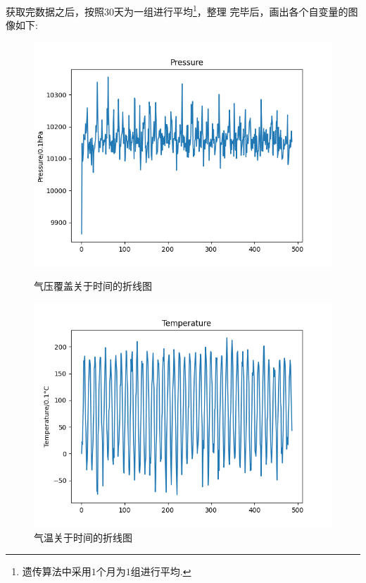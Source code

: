 \documentclass[UTF8, a4paper]{ctexart}
\begin{document}
获取完数据之后，按照$30$天为一组进行平均\footnote{遗传算法中采用$1$个月为$1$组进行平均.}，整理
完毕后，画出各个自变量的图像如下:
\begin{figure}[h!]
	\centering
	\begin{minipage}[h!]{0.4\textwidth}
		\centering
		\includegraphics[scale=0.3]{pp.png}
		\caption{气压覆盖关于时间的折线图}
	\end{minipage}
	\qquad
	\begin{minipage}[h!]{0.4\textwidth}
		\centering
		\includegraphics[scale=0.3]{tg.png}
		\caption{气温关于时间的折线图}
	\end{minipage}
\end{figure}
\end{document}
